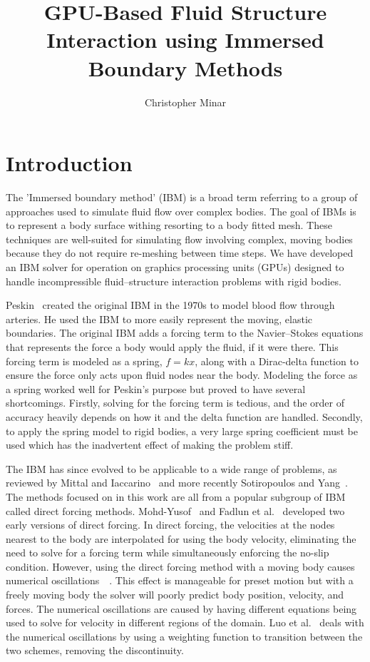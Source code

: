 \documentclass[onehalf,11pt]{beavtex}
\title{GPU-Based Fluid Structure Interaction using Immersed Boundary Methods}
\author{Christopher Minar}
\begin{document}
\maketitle

\mainmatter

\chapter{Introduction}
The 'Immersed boundary method' (IBM) is a broad term referring to a group of approaches used to simulate fluid flow over complex bodies.
The goal of IBMs is to represent a body surface withing resorting to a body fitted mesh.
These techniques are well-suited for simulating flow involving complex, moving bodies because they do not require re-meshing between time steps.
We have developed an IBM solver for operation on graphics processing units (GPUs) designed to handle incompressible fluid--structure interaction problems with rigid bodies.

Peskin~\cite{Peskin:1972gh} created the original IBM in the 1970s to model blood flow through arteries. 
He used the IBM to more easily represent the moving, elastic boundaries.
The original IBM adds a forcing term to the Navier--Stokes equations that represents the force a body would apply the fluid, if it were there.
This forcing term is modeled as a spring, $f=kx$, along with a Dirac-delta function to ensure the force only acts upon fluid nodes near the body.
Modeling the force as a spring worked well for Peskin's purpose but proved to have several shortcomings.
Firstly, solving for the forcing term is tedious, and the order of accuracy heavily depends on how it and the delta function are handled. 
Secondly, to apply the spring model to rigid bodies, a very large spring coefficient must be used which has the inadvertent effect of making the problem stiff. 

The IBM has since evolved to be applicable to a wide range of problems, as reviewed by Mittal and Iaccarino~\cite{Mittal:2005ii} and more recently Sotiropoulos and Yang~\cite{Sotiropoulos:2014gv}. 
The methods focused on in this work are all from a popular subgroup of IBM called direct forcing methods. 
Mohd-Yusof~\cite{MohdYusof:1997wh} and Fadlun et al.~\cite{Fadlun:2000fl} developed two early versions of direct forcing. 
In direct forcing, the velocities at the nodes nearest to the body are interpolated for using the body velocity, eliminating the need to solve for a forcing term while simultaneously enforcing the no-slip condition.
However, using the direct forcing method with a moving body causes numerical oscillations~\cite{liao2010simulating}~\cite{Luo:2012gx}.
This effect is manageable for preset motion but with a freely moving body the solver will poorly predict body position, velocity, and forces. 
The numerical oscillations are caused by having different equations being used to solve for velocity in different regions of the domain. 
Luo et al.~\cite{Luo:2012gx} deals with the numerical oscillations by using a weighting function to transition between the two schemes, removing the discontinuity.
\end{document}
